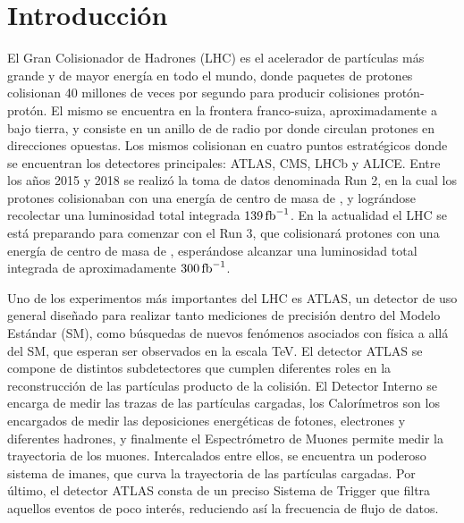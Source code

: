 \chapter*{Introducción}

El Gran Colisionador de Hadrones (LHC) es el acelerador de partículas más grande y de mayor energía en todo el mundo, donde paquetes de protones colisionan 40 millones de veces por segundo para producir colisiones protón-protón. El mismo se encuentra en la frontera franco-suiza, aproximadamente a  bajo tierra, y consiste en un anillo de  de radio por donde circulan protones en direcciones opuestas. Los mismos colisionan en cuatro puntos estratégicos donde se encuentran los detectores principales: ATLAS, CMS, LHCb y ALICE.
Entre los años 2015 y 2018 se realizó la toma de datos denominada Run 2, en la cual los protones colisionaban con una energía de centro de masa de , y lográndose recolectar una luminosidad total integrada $139\,\text{fb}^{-1}$. En la actualidad el LHC se está preparando para comenzar con el Run 3, que colisionará protones con una energía de centro de masa de , esperándose alcanzar una luminosidad total integrada de aproximadamente $300\,\text{fb}^{-1}$.

Uno de los experimentos más importantes del LHC es ATLAS, un detector de uso general diseñado para realizar tanto mediciones de precisión dentro del Modelo Estándar (SM), como búsquedas de nuevos fenómenos asociados con física a allá del SM, que esperan ser observados en la escala TeV. El detector ATLAS se compone de distintos subdetectores que cumplen diferentes roles en la reconstrucción de las partículas producto de la colisión. El Detector Interno se encarga de medir las trazas de las partículas cargadas, los Calorímetros son los encargados de medir las deposiciones energéticas de fotones, electrones y diferentes hadrones, y finalmente el Espectrómetro de Muones permite medir la trayectoria de los muones. Intercalados entre ellos, se encuentra un poderoso sistema de imanes, que curva la trayectoria de las partículas cargadas. Por último, el detector ATLAS consta de un preciso Sistema de Trigger que filtra aquellos eventos de poco interés, reduciendo así la frecuencia de flujo de datos.



